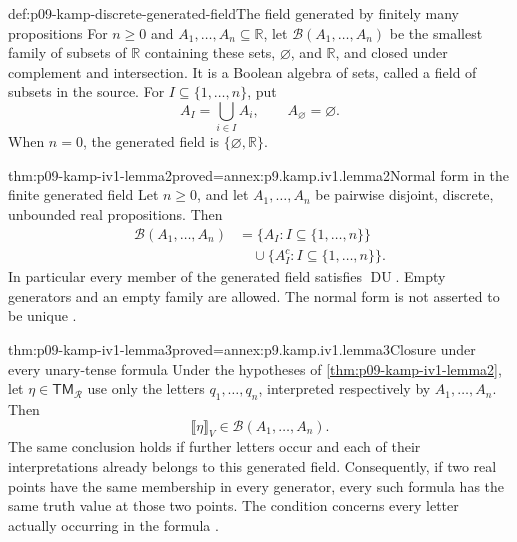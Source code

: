 \begin{hbdefinition}{def:p09-kamp-discrete-generated-field}{The field generated by finitely many propositions}
For \(n\geq0\) and \(A_1,\ldots,A_n\subseteq\mathbb R\),
let \(\mathcal B(A_1,\ldots,A_n)\) be the smallest family of
subsets of \(\mathbb R\) containing these sets,
\(\varnothing\), and \(\mathbb R\), and closed under
complement and intersection. It is a Boolean algebra of sets, called
a field of subsets in the source. For
\(I\subseteq\{1,\ldots,n\}\), put
\[
                         A_I=\bigcup_{i\in I}A_i,
                  \qquad A_{\varnothing}=\varnothing.
\]
When \(n=0\), the generated field is
\(\{\varnothing,\mathbb R\}\).
\end{hbdefinition}

\begin{hblemma}{thm:p09-kamp-iv1-lemma2}{proved=annex:p9.kamp.iv1.lemma2}{Normal form in the finite generated field}
Let \(n\geq0\), and let \(A_1,\ldots,A_n\) be pairwise
disjoint, discrete, unbounded real propositions. Then
\[
\begin{aligned}
 \mathcal B(A_1,\ldots,A_n)
 &=\{A_I:I\subseteq\{1,\ldots,n\}\}\\
 &\quad\cup\{A_I^c:I\subseteq\{1,\ldots,n\}\}.
\end{aligned}
\]
In particular every member of the generated field satisfies
\(\operatorname{DU}\). Empty generators and an empty family are
allowed. The normal form is not asserted to be unique
\cite[ch.~IV, lemma~2, pp.~97--98]{Kamp1968}.
\end{hblemma}

\begin{hblemma}{thm:p09-kamp-iv1-lemma3}{proved=annex:p9.kamp.iv1.lemma3}{Closure under every unary-tense formula}
Under the hypotheses of \cref{thm:p09-kamp-iv1-lemma2}, let
\(\eta\in\mathsf{TM}_{\mathcal R}\) use only the letters
\(q_1,\ldots,q_n\), interpreted respectively by
\(A_1,\ldots,A_n\). Then
\[
              \llbracket\eta\rrbracket_V
                    \in\mathcal B(A_1,\ldots,A_n).
\]
The same conclusion holds if further letters occur and each of their
interpretations already belongs to this generated field. Consequently,
if two real points have the same membership in every generator, every
such formula has the same truth value at those two points.
The condition concerns every letter actually occurring in the formula
\cite[ch.~IV, lemma~3, p.~98]{Kamp1968}.
\end{hblemma}

